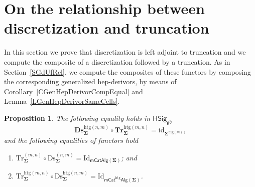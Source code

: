 \documentclass[a4paper, reqno]{amsbook}
\newcommand{\sig}[1]{\mathbf{#1}}             %
\newcommand{\gd}{\mathfrak{gd}}              %
\newcommand{\htg}{\mathrm{htg}}                %
\newcommand{\id}{\mathrm{id}}
\newcommand{\Id}{\mathrm{Id}}
\newcommand{\Ds}{\mathrm{Ds}}
\newcommand{\Tr}{\mathrm{Tr}}
\newcommand{\bDs}{\mathbf{Ds}}
\newcommand{\bTr}{\mathbf{Tr}}
\theoremstyle{plain}
\newtheorem{proposition}[theorem]{Proposition}
\theoremstyle{definition}
\begin{document}
\section{On the relationship between discretization and truncation}\label{SDsTrRel}

In this section we prove that discretization is left adjoint to truncation and we compute the composite of a discretization followed by a truncation.
As in Section~\ref{SGdUfRel}, we compute the composites of these functors by composing the corresponding generalized hep-derivors, by means of Corollary~\ref{CGenHepDerivorCompEqual} and Lemma~\ref{LGenHepDerivorSameCells}.

\begin{proposition}\label{PTrDsId}
The following equality holds in $\mathsf{HSig}_{\gd}$
$$
\bDs^{\htg(n,m)}_{\sig{\Sigma}}\circ\bTr^{\htg(m,n)}_{\sig{\Sigma}}=\id_{\sig{\Sigma}^{\htg(m)}},
$$
and the following equalities of functors hold
\begin{enumerate}
	\item
	$\Tr^{(m,n)}_{\sig{\Sigma}}\circ\Ds^{(n,m)}_{\sig{\Sigma}}=\Id_{\mathsf{mCatAlg}(\sig{\Sigma})}$; and

	\item
	$\Tr^{\htg(m,n)}_{\sig{\Sigma}}\circ\Ds^{\htg(n,m)}_{\sig{\Sigma}}=\Id_{\mathsf{mCat}^{\htg}\mathsf{Alg}(\sig{\Sigma})}$.
\end{enumerate}
\end{proposition}
\end{document}
